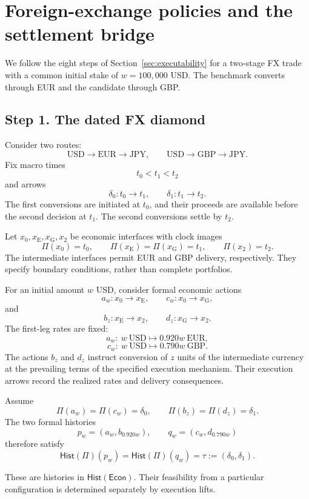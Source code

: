\documentclass[11pt,a4paper]{article}
\newcommand{\Econ}{\mathsf{Econ}}
\newcommand{\Hist}{\mathsf{Hist}}
\begin{document}
\section{Foreign-exchange policies and the settlement bridge}
\label{sec:fxExample}

We follow the eight steps of Section~\ref{sec:executability} for
a two-stage FX trade with a common initial stake of $w=100{,}000$ USD.
The benchmark converts through EUR and the candidate through GBP.
\subsection{Step 1. The dated FX diamond}

Consider two routes:
\[
  \mathrm{USD}\to\mathrm{EUR}\to\mathrm{JPY},
  \qquad
  \mathrm{USD}\to\mathrm{GBP}\to\mathrm{JPY}.
\]
Fix macro times
\[
  t_0<t_1<t_2
\]
and arrows
\[
  \delta_0:t_0\to t_1,
  \qquad
  \delta_1:t_1\to t_2.
\]
The first conversions are initiated at $t_0$, and their proceeds
are available before the second decision at $t_1$.
The second conversions settle by $t_2$.

Let $x_0,x_{\mathrm E},x_{\mathrm G},x_2$ be economic interfaces
with clock images
\[
  \Pi(x_0)=t_0,\qquad
  \Pi(x_{\mathrm E})=\Pi(x_{\mathrm G})=t_1,\qquad
  \Pi(x_2)=t_2.
\]
The intermediate interfaces permit EUR and GBP delivery,
respectively.  They specify boundary conditions, rather than
complete portfolios.

For an initial amount $w$ USD, consider formal economic actions
\[
  a_w:x_0\to x_{\mathrm E},
  \qquad
  c_w:x_0\to x_{\mathrm G},
\]
and
\[
  b_z:x_{\mathrm E}\to x_2,
  \qquad
  d_z:x_{\mathrm G}\to x_2.
\]
The first-leg rates are fixed:
\[
  a_w:\ w\ \mathrm{USD}\mapsto0.920w\ \mathrm{EUR},
\]
\[
  c_w:\ w\ \mathrm{USD}\mapsto0.790w\ \mathrm{GBP}.
\]
The actions $b_z$ and $d_z$ instruct conversion of $z$ units of
the intermediate currency at the prevailing terms of the specified
execution mechanism. Their execution arrows record the realized
rates and delivery consequences.

Assume
\[
  \Pi(a_w)=\Pi(c_w)=\delta_0,
  \qquad
  \Pi(b_z)=\Pi(d_z)=\delta_1.
\]
The two formal histories
\[
  p_w=(a_w,b_{0.920w}),
  \qquad
  q_w=(c_w,d_{0.790w})
\]
therefore satisfy
\[
  \Hist(\Pi)(p_w)
  =
  \Hist(\Pi)(q_w)
  =
  \tau:=(\delta_0,\delta_1).
\]

These are histories in $\Hist(\Econ)$.
Their feasibility from a particular configuration is determined
separately by execution lifts.
\end{document}
